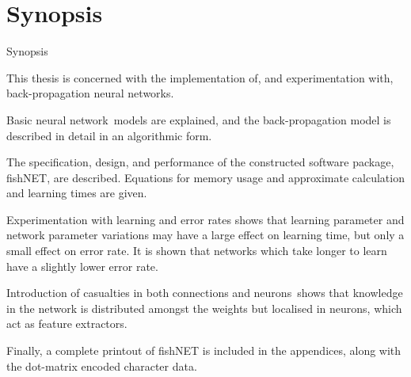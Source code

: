 \def\nn {neural network}
\def\nns {neural networks}
\def\Nn {Neural network}
\def\NN {Neural Network}
\def\neu {neuron}
\def\neus {neurons}

\part {Synopsis} {}

\chap Synopsis

This thesis is concerned with the implementation of, and
experimentation with, back-propagation \nn s.

Basic \nn\ models are explained, and the back-propagation model is
described in detail in an algorithmic form.

The specification, design, and performance of the constructed software 
package, fishNET, are described.
Equations for memory usage and approximate calculation and learning
times are given.

Experimentation with learning and error rates shows that learning
parameter and network parameter variations may have a large effect
on learning time, but only a small effect on error rate.
It is shown that networks which take longer to learn have a
slightly lower error rate.

Introduction of casualties in both connections and \neus\ shows
that knowledge in the network is distributed amongst the weights but
localised in \neus, which act as feature extractors.

Finally, a complete printout of fishNET is included in the
appendices, along with the dot-matrix encoded character data.

